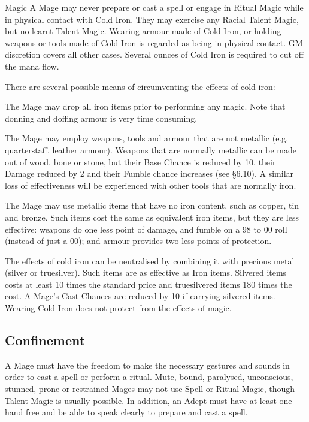 \begin{Chapter}{Magic}
A Mage may never prepare or cast a spell or engage in Ritual Magic
while in physical contact with Cold Iron.  They may exercise any
Racial Talent Magic, but no learnt Talent Magic.  Wearing armour made
of Cold Iron, or holding weapons or tools made of Cold Iron is
regarded as being in physical contact.  GM discretion covers all other
cases.  Several ounces of Cold Iron is required to cut off the mana
flow.

There are several possible means of circumventing the effects of cold
iron:

\begin{Enumerate}

\item The Mage may drop all iron items prior to performing any
  magic. Note that donning and doffing armour is very time consuming.

\item The Mage may employ weapons, tools and armour that are not
  metallic (e.g. quarterstaff, leather armour).  Weapons that are
  normally metallic can be made out of wood, bone or stone, but their
  Base Chance is reduced by 10, their Damage reduced by 2 and their
  Fumble chance increases (see §6.10). A similar loss of effectiveness
  will be experienced with other tools that are normally iron.

\item The Mage may use metallic items that have no iron content, such
  as copper, tin and bronze.  Such items cost the same as equivalent
  iron items, but they are less effective: weapons do one less point
  of damage, and fumble on a 98 to 00 roll (instead of just a 00); and
  armour provides two less points of protection.

\item The effects of cold iron can be neutralised by combining it with
  precious metal (silver or truesilver).  Such items are as effective
  as Iron items.  Silvered items costs at least 10 times the standard
  price and truesilvered items 180 times the cost.  A Mage’s Cast
  Chances are reduced by 10 if carrying silvered items. Wearing Cold
  Iron does not protect from the effects of magic.

\end{Enumerate}


\subsection{Confinement}

A Mage must have the freedom to make the necessary gestures and sounds
in order to cast a spell or perform a ritual.  Mute, bound, paralysed,
unconscious, stunned, prone or restrained Mages may not use Spell or
Ritual Magic, though Talent Magic is usually possible.  In addition,
an Adept must have at least one hand free and be able to speak clearly
to prepare and cast a spell.


\end{Chapter}
